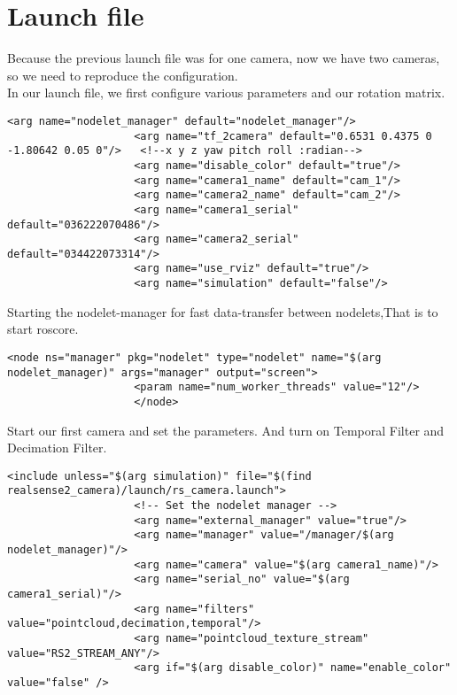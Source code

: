 				\section{Launch file}
				Because the previous launch file was for one camera, now we have two cameras, so we need to reproduce the configuration.\\
				In our launch file, we first configure various parameters and our rotation matrix.\\
				\begin{lstlisting}[caption={}]
					<arg name="nodelet_manager" default="nodelet_manager"/>
					<arg name="tf_2camera" default="0.6531 0.4375 0 -1.80642 0.05 0"/>   <!--x y z yaw pitch roll :radian--> 
					<arg name="disable_color" default="true"/>
					<arg name="camera1_name" default="cam_1"/>
					<arg name="camera2_name" default="cam_2"/>
					<arg name="camera1_serial" default="036222070486"/>
					<arg name="camera2_serial" default="034422073314"/>
					<arg name="use_rviz" default="true"/>
					<arg name="simulation" default="false"/>
				\end{lstlisting}
				Starting the nodelet-manager for fast data-transfer between nodelets,That is to start roscore.\\
				\begin{lstlisting}[caption={}]
					<node ns="manager" pkg="nodelet" type="nodelet" name="$(arg nodelet_manager)" args="manager" output="screen">
					<param name="num_worker_threads" value="12"/>
					</node>
				\end{lstlisting}	
				
				
				Start our first camera and set the parameters. And turn on Temporal Filter and Decimation Filter.\\
				\begin{lstlisting}[caption={}]
					<include unless="$(arg simulation)" file="$(find realsense2_camera)/launch/rs_camera.launch">
					<!-- Set the nodelet manager -->
					<arg name="external_manager" value="true"/>
					<arg name="manager" value="/manager/$(arg nodelet_manager)"/>
					<arg name="camera" value="$(arg camera1_name)"/>
					<arg name="serial_no" value="$(arg camera1_serial)"/>
					<arg name="filters" value="pointcloud,decimation,temporal"/>
					<arg name="pointcloud_texture_stream" value="RS2_STREAM_ANY"/>
					<arg if="$(arg disable_color)" name="enable_color" value="false" /> 
				\end{lstlisting}
				
